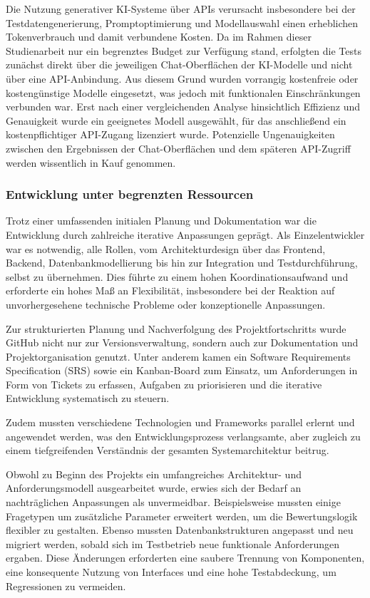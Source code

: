 \documentclass[a4paper,12pt]{article}
\begin{document}
Die Nutzung generativer KI-Systeme über APIs verursacht insbesondere bei der Testdatengenerierung, Promptoptimierung und Modellauswahl einen erheblichen Tokenverbrauch und damit verbundene Kosten. Da im Rahmen dieser Studienarbeit nur ein begrenztes Budget zur Verfügung stand, erfolgten die Tests zunächst direkt über die jeweiligen Chat-Oberflächen der KI-Modelle und nicht über eine API-Anbindung. Aus diesem Grund wurden vorrangig kostenfreie oder kostengünstige Modelle eingesetzt, was jedoch mit funktionalen Einschränkungen verbunden war. Erst nach einer vergleichenden Analyse hinsichtlich Effizienz und Genauigkeit wurde ein geeignetes Modell ausgewählt, für das anschließend ein kostenpflichtiger API-Zugang lizenziert wurde. Potenzielle Ungenauigkeiten zwischen den Ergebnissen der Chat-Oberflächen und dem späteren API-Zugriff werden wissentlich in Kauf genommen.

\subsubsection{Entwicklung unter begrenzten Ressourcen}

Trotz einer umfassenden initialen Planung und Dokumentation war die Entwicklung durch zahlreiche iterative Anpassungen geprägt. Als Einzelentwickler war es notwendig, alle Rollen, vom Architekturdesign über das Frontend, Backend, Datenbankmodellierung bis hin zur Integration und Testdurchführung, selbst zu übernehmen. Dies führte zu einem hohen Koordinationsaufwand und erforderte ein hohes Maß an Flexibilität, insbesondere bei der Reaktion auf unvorhergesehene technische Probleme oder konzeptionelle Anpassungen.

Zur strukturierten Planung und Nachverfolgung des Projektfortschritts wurde GitHub nicht nur zur Versionsverwaltung, sondern auch zur Dokumentation und Projektorganisation genutzt. Unter anderem kamen ein Software Requirements Specification (SRS) sowie ein Kanban-Board zum Einsatz, um Anforderungen in Form von Tickets zu erfassen, Aufgaben zu priorisieren und die iterative Entwicklung systematisch zu steuern.

Zudem mussten verschiedene Technologien und Frameworks parallel erlernt und angewendet werden, was den Entwicklungsprozess verlangsamte, aber zugleich zu einem tiefgreifenden Verständnis der gesamten Systemarchitektur beitrug.

Obwohl zu Beginn des Projekts ein umfangreiches Architektur- und Anforderungsmodell ausgearbeitet wurde, erwies sich der Bedarf an nachträglichen Anpassungen als unvermeidbar. Beispielsweise mussten einige Fragetypen um zusätzliche Parameter erweitert werden, um die Bewertungslogik flexibler zu gestalten. Ebenso mussten Datenbankstrukturen angepasst und neu migriert werden, sobald sich im Testbetrieb neue funktionale Anforderungen ergaben. Diese Änderungen erforderten eine saubere Trennung von Komponenten, eine konsequente Nutzung von Interfaces und eine hohe Testabdeckung, um Regressionen zu vermeiden.
\end{document}
